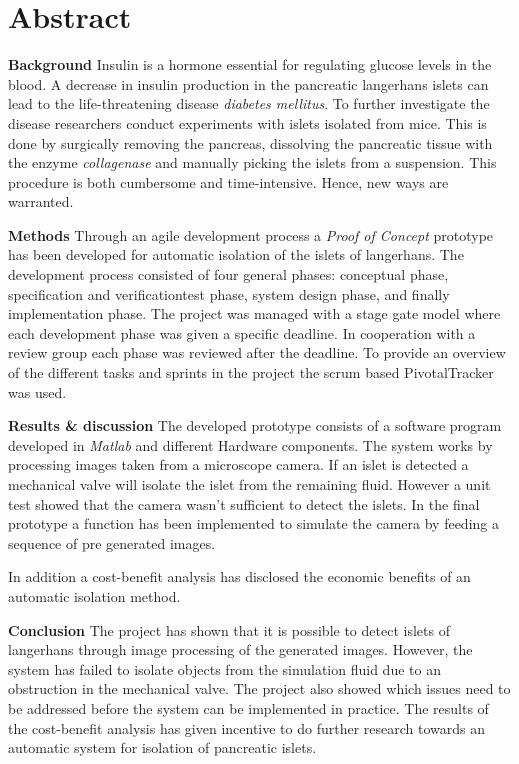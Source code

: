 \section*{Abstract}
\textbf{Background}
Insulin is a hormone essential for regulating glucose levels in the blood. A decrease in insulin production in the pancreatic langerhans islets can lead to the life-threatening disease \textit{diabetes mellitus}. To further investigate the disease researchers conduct experiments with islets isolated from mice. This is done by surgically removing the pancreas, dissolving the pancreatic tissue with the enzyme \textit{collagenase} and manually picking the islets from a suspension. This procedure is both cumbersome and time-intensive. Hence, new ways are warranted.   

\textbf{Methods}
Through an agile development process a \textit{Proof of Concept} prototype has been developed for automatic isolation of the islets of langerhans. The development process consisted of four general phases: conceptual phase,  specification and verificationtest phase, system design phase, and finally implementation phase. The project was managed with a stage gate model where each development phase was given a specific deadline. In cooperation with a review group each phase was reviewed after the deadline. To provide an overview of the different tasks and sprints in the project the scrum based PivotalTracker was used.   


\textbf{Results \& discussion} The developed prototype consists of a software program developed in \textit{Matlab} and different Hardware components.  The system works by processing images taken from a microscope camera. If an islet is detected a mechanical valve will isolate the islet from the remaining fluid. However a unit test showed that the camera wasn't sufficient to detect the islets. In the final prototype a function has been implemented to simulate the camera by feeding a sequence of pre generated images.

In addition a cost-benefit analysis has disclosed the economic benefits of an automatic isolation method.

\textbf{Conclusion}
The project has shown that it is possible to detect islets of langerhans through image processing of the generated images. However, the system has failed to isolate objects from the simulation fluid due to an obstruction in the mechanical valve. The project also showed which issues need to be addressed before the system can be implemented in practice. The results of the cost-benefit analysis has given incentive to do further research towards an automatic system for isolation of pancreatic islets. 
